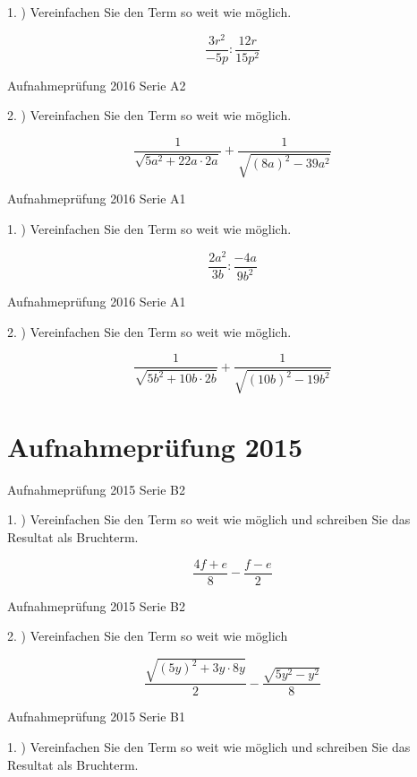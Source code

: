 1. ) Vereinfachen Sie den Term so weit wie möglich. 

$$\frac{3r^2}{-5p} : \frac{12r}{15p^2}$$


Aufnahmeprüfung 2016 Serie A2

2. ) Vereinfachen Sie den Term so weit wie möglich. 

$$\frac1{\sqrt{5a^2+22a\cdot{}2a}} + \frac1{\sqrt{(8a)^2-39a^2}}$$


Aufnahmeprüfung 2016 Serie A1

1. ) Vereinfachen Sie den Term so weit wie möglich. 

$$\frac{2a^2}{3b} : \frac{-4a}{9b^2}$$


Aufnahmeprüfung 2016 Serie A1

2. ) Vereinfachen Sie den Term so weit wie möglich. 

$$\frac1{\sqrt{5b^2+10b\cdot{}2b}} + \frac1{\sqrt{(10b)^2-19b^2}}$$

\section*{Aufnahmeprüfung 2015}
Aufnahmeprüfung 2015 Serie B2

1. ) Vereinfachen Sie den Term so weit wie möglich und schreiben Sie
das Resultat als Bruchterm.

$$\frac{4f+e}8 - \frac{f-e}2$$

Aufnahmeprüfung 2015 Serie B2

2. ) Vereinfachen Sie den Term so weit wie möglich

$$\frac{\sqrt{(5y)^2+3y\cdot{}8y}}2 - \frac{\sqrt{5y^2-y^2}}8$$

Aufnahmeprüfung 2015 Serie B1

1. ) Vereinfachen Sie den Term so weit wie möglich und schreiben Sie
das Resultat als Bruchterm.

